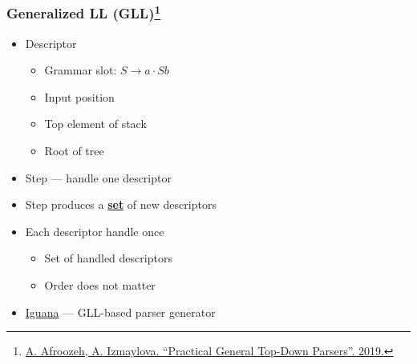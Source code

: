 \documentclass[xcolor=table,aspectratio=169]{beamer}
\begin{document}
\begin{frame}[fragile]
  \frametitle{Generalized LL (GLL)\footnote{\href{https://www.cwi.nl/nieuws/2019/thesis_final-1.pdf}{A. Afroozeh, A. Izmaylova. ``Practical General Top-Down Parsers''. 2019.}}}  
  \begin{minipage}[t]{0.48\textwidth}
  \begin{itemize}
    \item Descriptor
    \begin{itemize}
      \item Grammar slot: $S \to a \cdot S b$
      \item Input position
      \item Top element of stack
      \item Root of tree
    \end{itemize}   
  \end{itemize}
\end{minipage}
\pause
\begin{minipage}[t]{0.48\textwidth}
  \begin{itemize}
    \item Step --- handle one descriptor
    \item Step produces a \underline{\textbf{set}} of new descriptors
    \item Each descriptor handle once 
    \begin{itemize}
      \item Set of handled descriptors
      \item Order does not matter
    \end{itemize}
  \end{itemize}   
\end{minipage}
\pause
\vfill
\begin{itemize}
  \item \href{https://github.com/iguana-parser/iguana}{Iguana} --- GLL-based parser generator
\end{itemize}
\end{frame}
\end{document}
